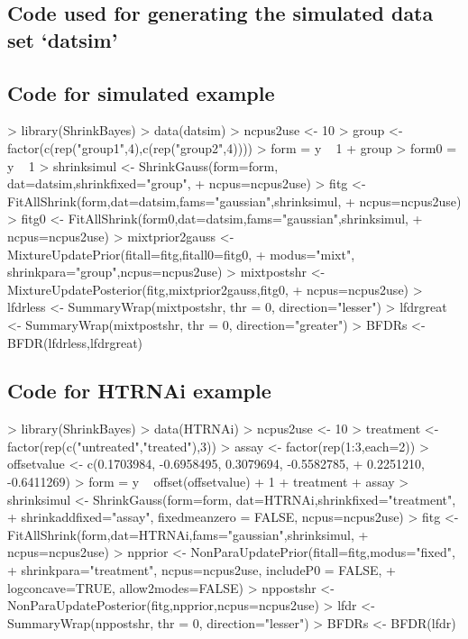 \documentclass[11pt]{article}
\begin{document}
\subsection{Code used for generating the simulated data set `datsim'}\label{simulation}

\begin{Schunk}
\end{Schunk}

\subsection{Code for simulated example}
\begin{Schunk}
\begin{Sinput}
> library(ShrinkBayes)
> data(datsim)
> ncpus2use <- 10
> group <- factor(c(rep("group1",4),c(rep("group2",4))))
> form = y ~  1 + group
> form0 = y ~ 1
> shrinksimul <- ShrinkGauss(form=form, dat=datsim,shrinkfixed="group",
+ ncpus=ncpus2use)
> fitg <- FitAllShrink(form,dat=datsim,fams="gaussian",shrinksimul,
+ ncpus=ncpus2use)
> fitg0 <- FitAllShrink(form0,dat=datsim,fams="gaussian",shrinksimul,
+ ncpus=ncpus2use)
> mixtprior2gauss <- MixtureUpdatePrior(fitall=fitg,fitall0=fitg0,
+ modus="mixt", shrinkpara="group",ncpus=ncpus2use)
> mixtpostshr <- MixtureUpdatePosterior(fitg,mixtprior2gauss,fitg0,
+ ncpus=ncpus2use)
> lfdrless <- SummaryWrap(mixtpostshr, thr = 0, direction="lesser")
> lfdrgreat <- SummaryWrap(mixtpostshr, thr = 0, direction="greater")
> BFDRs <- BFDR(lfdrless,lfdrgreat)
\end{Sinput}
\end{Schunk}

\subsection{Code for HTRNAi example}
\begin{Schunk}
\begin{Sinput}
> library(ShrinkBayes)
> data(HTRNAi)
> ncpus2use <- 10
> treatment <- factor(rep(c("untreated","treated"),3))
> assay <- factor(rep(1:3,each=2))
> offsetvalue <- c(0.1703984, -0.6958495,  0.3079694, -0.5582785,
+ 0.2251210, -0.6411269)
> form = y ~ offset(offsetvalue) + 1 + treatment + assay
> shrinksimul <- ShrinkGauss(form=form, dat=HTRNAi,shrinkfixed="treatment",
+ shrinkaddfixed="assay", fixedmeanzero = FALSE, ncpus=ncpus2use)
> fitg <- FitAllShrink(form,dat=HTRNAi,fams="gaussian",shrinksimul,
+ ncpus=ncpus2use)
> npprior <- NonParaUpdatePrior(fitall=fitg,modus="fixed",
+ shrinkpara="treatment", ncpus=ncpus2use, includeP0 = FALSE,
+ logconcave=TRUE, allow2modes=FALSE)
> nppostshr <- NonParaUpdatePosterior(fitg,npprior,ncpus=ncpus2use)
> lfdr <- SummaryWrap(nppostshr, thr = 0, direction="lesser")
> BFDRs <- BFDR(lfdr)
\end{Sinput}
\end{Schunk}
\end{document}

